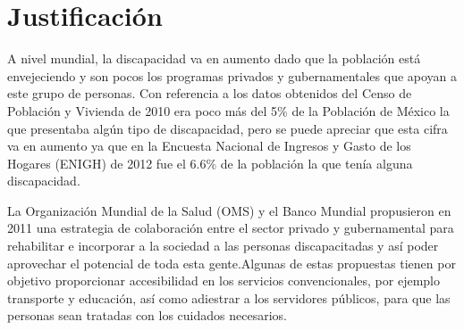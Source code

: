 
\section{Justificaci\'on}




A nivel mundial, la discapacidad va en aumento dado que la poblaci\'on est\'a
 envejeciendo y son pocos los programas privados y gubernamentales que apoyan 
 a este grupo de personas\cite{OrganizacionMundialdelaSalud2011}. 
 Con referencia a los datos obtenidos del Censo de Poblaci\'on
 y Vivienda de 2010 era poco m\'as del 5\% de la Poblaci\'on de M\'exico la 
 que presentaba alg\'un tipo de discapacidad, pero se puede apreciar que esta 
 cifra va en aumento ya que en la Encuesta Nacional de Ingresos y Gasto de 
 los Hogares (ENIGH) de 2012 fue el 6.6\% de la poblaci\'on la que ten\'ia 
 alguna discapacidad\cite{Milosavljevic2014}.

La Organizaci\'on Mundial de la Salud (OMS) y el Banco Mundial
 propusieron en 2011 \cite{OrganizacionMundialdelaSalud2011} una
 estrategia de colaboraci\'on entre el sector privado y gubernamental para
 rehabilitar e incorporar a la sociedad a las personas discapacitadas y as\'i
 poder aprovechar el potencial de toda esta gente.Algunas de estas propuestas
 tienen por objetivo proporcionar accesibilidad en los servicios 
 convencionales, por ejemplo transporte y educaci\'on, as\'i como adiestrar a 
 los servidores p\'ublicos, para que las personas sean tratadas con los 
 cuidados necesarios.
 